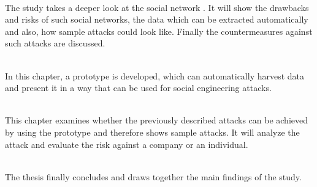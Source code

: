 \vspace{0.5em}\\
\noindent The study takes a deeper look at the social network \Twitter. It will
show the drawbacks and risks of such social networks, the data which can be
extracted automatically and also, how sample attacks could look like. Finally the
countermeasures against such attacks are discussed.

\vspace{0.5em}\\
\noindent In this chapter, a prototype is developed, which can automatically harvest data and
present it in a way that can be used for social engineering attacks.

\vspace{0.5em}\\
\noindent This chapter examines whether the previously described attacks
can be achieved by using the prototype and therefore shows sample attacks. It
will analyze the attack and evaluate the risk against a company or an
individual.

\vspace{0.5em}\\
\noindent The thesis finally concludes and draws together the main findings of the
study.

\def\chapterautorefname{\oldchapterautorefname}
\newpage

